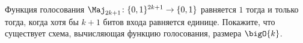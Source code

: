 Функция голосования $\Maj_{2k + 1}\colon \{0, 1\}^{2k + 1} \to \{0, 1\}$ равняется $1$ тогда и только
тогда, когда хотя бы $k + 1$ битов входа равняется единице. Покажите, что существует схема, вычисляющая
функцию голосования, размера $\bigO{k}$.
